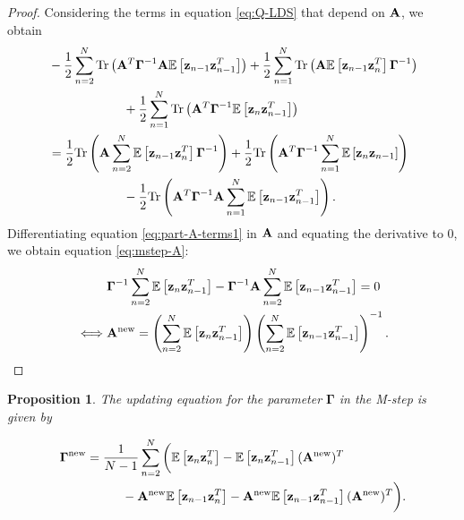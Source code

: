 \documentclass[12pt, oneside]{book}
\numberwithin{equation}{section}
\newcommand{\expectation}[1]{\mathbb{E}\left[#1\right]}
\newcommand{\z}{{\bf z}}
\newtheorem{proposition}{Proposition}[section]
\begin{document}
{\begin{proof}
	Considering the terms in equation \eqref{eq:Q-LDS} that depend on $\bf A$, we obtain
	\begin{align}
		& -\frac{1}{2}\sum_{n=2}^N \text{Tr}\left({\bf A}^T\boldsymbol{\Gamma}^{-1}{\bf A}\expectation{\z_{n-1}\z_{n-1}^T}\right) + \frac{1}{2}\sum_{n=1}^N\text{Tr}\left({\bf A}\expectation{\z_{n-1}\z_n^T}\boldsymbol{\Gamma}^{-1}\right) \nonumber\\
		&\hspace{2.1cm} + \frac{1}{2}\sum_{n=1}^N\text{Tr}\left({\bf A}^T \boldsymbol\Gamma^{-1} \expectation{\z_n\z_{n-1}^T}\right)\\
		&= \frac{1}{2}\text{Tr}\left({\bf A} \sum_{n=2}^N \expectation{\z_{n-1}\z_n^T} \boldsymbol\Gamma^{-1}\right) + \frac{1}{2}\text{Tr}\left({\bf A}^T\boldsymbol\Gamma^{-1} \sum_{n=1}^N\expectation{\z_n\z_{n-1}}\right) \nonumber\\
		&\hspace{2.1cm} - \frac{1}{2}\text{Tr}\left({\bf A}^T \boldsymbol\Gamma^{-1} {\bf A}\sum_{n=1}^N \expectation{\z_{n-1}\z_{n-1}^T}\right)\label{eq:part-A-terms1}.
	\end{align}	
	Differentiating equation \eqref{eq:part-A-terms1} in $\bf A$ and equating the derivative to $0$, we obtain equation \eqref{eq:mstep-A}:
	\begin{align}
		&\boldsymbol{\Gamma}^{-1} \sum_{n=2}^N \expectation{\z_n\z_{n-1}^T} - \boldsymbol{\Gamma}^{-1} {\bf A} \sum_{n=2}^N\expectation{\z_{n-1}\z_{n-1}^T} = 0\\
		\iff& {\bf A}^{\text{new}} = \left(\sum_{n=2}^N \expectation{\z_n \z_{n-1}^T}\right)\left(\sum_{n=2}^N \expectation{\z_{n-1}\z_{n-1}^T}\right)^{-1}.
	\end{align}
\end{proof}


\begin{proposition}
	The updating equation for the parameter $\boldsymbol{\Gamma}$ in the M-step is given by
	
	\begin{align}
		\boldsymbol{\Gamma}^{\text{\normalfont new}} &= \frac{1}{N-1}\sum_{n=2}^N\bigg( \expectation{\z_n \z_n^T} - \expectation{\z_n \z_{n-1}^T}({\bf A}^{\text{\normalfont new}})^T \nonumber\\
		&\hspace{1cm} - {\bf A}^{\text{\normalfont new}}\expectation{\z_{n-1}\z_n^T} - {\bf A}^{\text{\normalfont new}}\expectation{\z_{n-1} \z_{n-1}^T}({\bf A}^{\text{\normalfont new}})^T \bigg). \label{eq:mstep-Gamma}\\
	\end{align}
\end{proposition}

}
\end{document}
